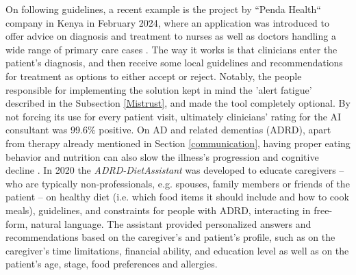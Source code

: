 On following guidelines, a recent example is the project by ``Penda Health`` company in Kenya in February 2024, where an application was introduced to offer advice on diagnosis and treatment to nurses as well as doctors handling a wide range of primary care cases \cite{korom2024}. The way it works is that clinicians enter the patient's diagnosis, and then receive some local guidelines and recommendations for treatment as options to either accept or reject. Notably, the people responsible for implementing the solution kept in mind the 'alert fatigue' described in the Subsection \ref{Mistrust}, and made the tool completely optional. By not forcing its use for every patient visit, ultimately clinicians' rating for the AI consultant was 99.6\% positive.
On AD and related dementias (ADRD), apart from therapy already mentioned in Section \ref{communication}, having proper eating behavior and nutrition can also slow the illness's progression and cognitive decline \cite{dietforAD2020}. In 2020 the \textit{ADRD-DietAssistant} was developed to educate caregivers -- who are typically non-professionals, e.g. spouses, family members or friends of the patient -- on healthy diet (i.e. which food items it should include and how to cook meals), guidelines, and constraints for people with ADRD, interacting in free-form, natural language. The assistant provided personalized answers and recommendations based on the caregiver's and patient's profile, such as on the caregiver's time limitations, financial ability, and education level as well as on the patient's age, stage, food preferences and allergies.

